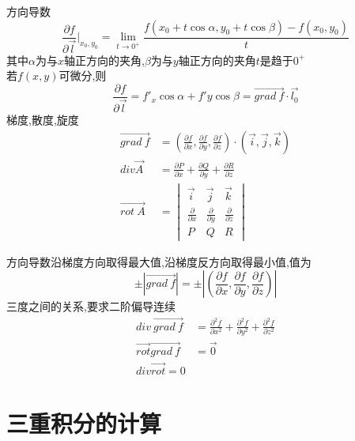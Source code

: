 \documentclass[12pt, a4paper, oneside, UTF8]{ctexbook}
\begin{document}
\begin{tcolorbox}[title=方向导数与三度]
方向导数 
$$
\frac{\partial f}{\partial \vec{l}}\big|_{x_0,y_0} = \lim_{t\to 0^{+}}\frac{f(x_0+t\cos{\alpha},y_0+t\cos{\beta})-f(x_0,y_0)}{t}
$$
其中$\alpha$为与$x$轴正方向的夹角,$\beta$为与$y$轴正方向的夹角$t$是趋于$0^{+}$ \\
若$f(x,y)$可微分,则
$$
\frac{\partial f}{\partial \vec{l}} = f'_x\cos\alpha + f'y\cos\beta = \vec{grad\ f} \cdot \vec{l_0}
$$
梯度,散度,旋度
\begin{align*}
    \vec{grad\ f} &= (\frac{\partial f}{\partial x},\frac{\partial f}{\partial y},\frac{\partial f}{\partial z})\cdot(\vec{i},\vec{j},\vec{k}) \\
    div\vec{A} &= \frac{\partial P}{\partial x} + \frac{\partial Q}{\partial y} + \frac{\partial R}{\partial z} \\
    \vec{rot\ A} &= \begin{vmatrix}
        \vec{i} & \vec{j} & \vec{k} \\
        \frac{\partial}{\partial x} & \frac{\partial}{\partial y} & \frac{\partial}{\partial z} \\
        P & Q & R
    \end{vmatrix}
\end{align*}

{\color{red}方向导数沿梯度方向取得最大值,沿梯度反方向取得最小值},值为
$$
\pm\left|\vec{grad\ f}\right| = \pm\left|(\frac{\partial f}{\partial x},\frac{\partial f}{\partial y},\frac{\partial f}{\partial z})\right|
$$
{\color{red} 三度之间的关系,要求二阶偏导连续}
\begin{align*}
    div\ \vec{grad\ f} &= \frac{\partial^2 f}{\partial x^2} + \frac{\partial^2 f}{\partial y^2} + \frac{\partial^2 f}{\partial z^2} \\
    \vec{rot}\vec{grad\ f} & = \vec{0} \\
    div\vec{rot} = 0
\end{align*}
\end{tcolorbox}
\section{三重积分的计算}
\end{document}
